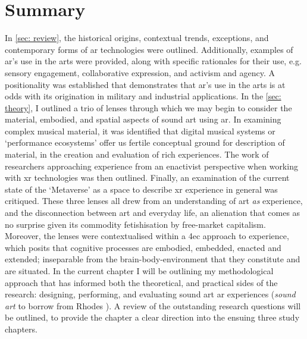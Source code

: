 \section{Summary}\label{sec: method-summary}
In \autoref{sec: review}, the historical origins, contextual trends, exceptions, and contemporary forms of \gls{ar} technologies were outlined. Additionally, examples of \gls{ar}'s use in the arts were provided, along with specific rationales for their use, e.g. sensory engagement, collaborative expression, and activism and agency. A positionality was established that demonstrates that \gls{ar}'s use in the arts is at odds with its origination in military and industrial applications. In the \autoref{sec: theory}, I outlined a trio of lenses through which we may begin to consider the material, embodied, and spatial aspects of sound art using \gls{ar}. In examining complex musical material, it was identified that digital musical systems or `performance ecosystems' offer us fertile conceptual ground for description of material, in the creation and evaluation of rich experiences. The work of researchers approaching experience from an enactivist perspective when working with \gls{xr} technologies was then outlined. Finally, an examination of the current state of the `Metaverse' as a space to describe \gls{xr} experience in general was critiqued. These three lenses all drew from an understanding of art \textit{as} experience, and the disconnection between art and everyday life, an alienation that comes as no surprise given its commodity fetishisation by free-market capitalism. Moreover, the lenses were contextualised within a \gls{4ec} approach to experience, which posits that cognitive processes are embodied, embedded, enacted and extended; inseparable from the brain-body-environment that they constitute and are situated. In the current chapter I will be outlining my methodological approach that has informed both the theoretical, and practical sides of the research: designing, performing, and evaluating sound art \gls{ar} experiences (\textit{sound \gls{art}} to borrow from Rhodes \citeyearpar{rhodes2018}). A review of the outstanding research questions will be outlined, to provide the chapter a clear direction into the ensuing three study chapters.

\begin{enumerate}
    \RQmedium
    \RQexperience
\end{enumerate}

